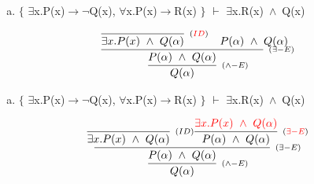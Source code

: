 \documentclass[aspectratio=43]{beamer}
\newcommand{\ria}{$\rightarrow$}
\newcommand{\fall}{$\forall$}
\newcommand{\ex}{$\exists$}
\newcommand{\nao}{$\neg$}
\newcommand{\andd}{$\wedge$}
\begin{document}
    \begin{frame}[fragile]
    
    	\begin{enumerate}[d)]
			\item $\{$ \ex x.P(x)\ria \nao Q(x), \fall x.P(x)\ria R(x) $\}$ $\vdash$ \ex x.R(x)\ \andd\ Q(x) \\
		\end{enumerate}
        
        \vspace{80pt}
        
        \[
        \begin{array}{c}
		
        	\infer[_{(\land -E)}] 
                	{Q(\alpha)}
                    {\infer[_{(\exists -E)}]
                    	{P(\alpha)\ \land \ Q(\alpha)}
                    	{\infer[_{(\textcolor{red}{ID})}]
                        	{\exists x.P(x)\ \land \ Q(\alpha)}
                            {}
                        \hspace{10pt}
                        P(\alpha)\ \land \ Q(\alpha)
                        }
                    }
		\end{array}
        \]
        
	\end{frame}
    
    \begin{frame}[fragile]
    
    	\begin{enumerate}[d)]
			\item $\{$ \ex x.P(x)\ria \nao Q(x), \fall x.P(x)\ria R(x) $\}$ $\vdash$ \ex x.R(x)\ \andd\ Q(x) \\
		\end{enumerate}
        
        \vspace{80pt}
        
        \[
        \begin{array}{c}
		
        	\infer[_{(\land -E)}] 
                	{Q(\alpha)}
                    {\infer[_{(\exists -E)}]
                    	{P(\alpha)\ \land \ Q(\alpha)}
                    	{\infer[_{(ID)}]
                        	{\exists x.P(x)\ \land \ Q(\alpha)}
                            {}
                        \infer[_{(\textcolor{red}{\exists -E})}] 
                        	{P(\alpha)\ \land \ Q(\alpha)}
                            {\textcolor{red}{\exists x.P(x)\ \land \ Q(\alpha)}}
                        }
                    }
		\end{array}
        \]
        
	\end{frame}
    
\end{document}
